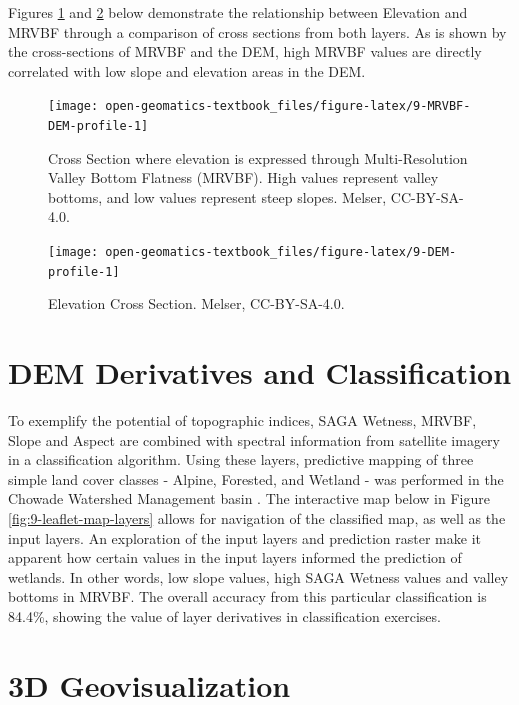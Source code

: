 \documentclass[
]{book}
\begin{document}
Figures \ref{fig:9-MRVBF-DEM-profile} and \ref{fig:9-DEM-profile} below demonstrate the relationship between Elevation and MRVBF through a comparison of cross sections from both layers. As is shown by the cross-sections of MRVBF and the DEM, high MRVBF values are directly correlated with low slope and elevation areas in the DEM.

\begin{figure}
\texttt{[image: open-geomatics-textbook\_files/figure-latex/9-MRVBF-DEM-profile-1]} \caption{Cross Section where elevation is expressed through Multi-Resolution Valley Bottom Flatness (MRVBF). High values represent valley bottoms, and low values represent steep slopes. Melser, CC-BY-SA-4.0.}\label{fig:9-MRVBF-DEM-profile}
\end{figure}

\begin{figure}
\texttt{[image: open-geomatics-textbook\_files/figure-latex/9-DEM-profile-1]} \caption{Elevation Cross Section. Melser, CC-BY-SA-4.0.}\label{fig:9-DEM-profile}
\end{figure}

\hypertarget{dem-derivatives-and-classification}{%
\section{DEM Derivatives and Classification}\label{dem-derivatives-and-classification}}

To exemplify the potential of topographic indices, SAGA Wetness, MRVBF, Slope and Aspect are combined with spectral information from satellite imagery in a classification algorithm. Using these layers, predictive mapping of three simple land cover classes - Alpine, Forested, and Wetland - was performed in the Chowade Watershed Management basin \citep{city_of_vancouver_notitle_2009}. The interactive map below in Figure \ref{fig:9-leaflet-map-layers} allows for navigation of the classified map, as well as the input layers. An exploration of the input layers and prediction raster make it apparent how certain values in the input layers informed the prediction of wetlands. In other words, low slope values, high SAGA Wetness values and valley bottoms in MRVBF. The overall accuracy from this particular classification is 84.4\%, showing the value of layer derivatives in classification exercises.

\hypertarget{d-geovisualization}{%
\section{3D Geovisualization}\label{d-geovisualization}}
\end{document}
